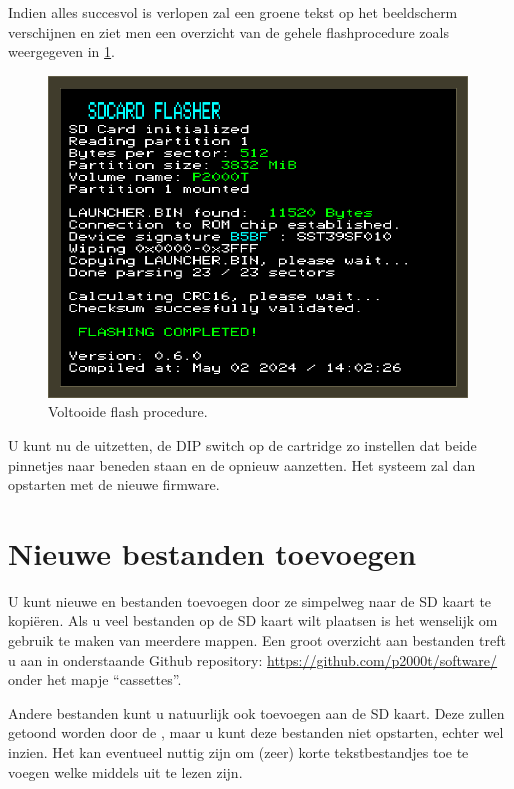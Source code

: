 Indien alles succesvol is verlopen zal een groene tekst op het beeldscherm verschijnen en ziet men een overzicht van de gehele flashprocedure zoals weergegeven in \cref{fig:flasher-done}.

\begin{figure}[h!]
    \centering
    \includegraphics[width=0.99\textwidth]{img/flasher_done.png}
    \caption{Voltooide flash procedure.}
    \label{fig:flasher-done}
\end{figure}

U kunt nu de  uitzetten, de DIP switch op de  cartridge zo instellen dat beide pinnetjes naar beneden staan en de  opnieuw aanzetten. Het systeem zal dan opstarten met de nieuwe firmware.

%
%
%
\section{Nieuwe bestanden toevoegen}

U kunt nieuwe  en  bestanden toevoegen door ze simpelweg naar de SD kaart te kopiëren. Als u veel bestanden op de SD kaart wilt plaatsen is het wenselijk om gebruik te maken van meerdere mappen. Een groot overzicht aan  bestanden treft u aan in onderstaande Github repository: \url{https://github.com/p2000t/software/}
onder het mapje ``cassettes''.

Andere bestanden kunt u natuurlijk ook toevoegen aan de SD kaart. Deze zullen getoond worden door de \product, maar u kunt deze bestanden niet opstarten, echter wel inzien. Het kan eventueel nuttig zijn om (zeer) korte tekstbestandjes toe te voegen welke middels  uit te lezen zijn.